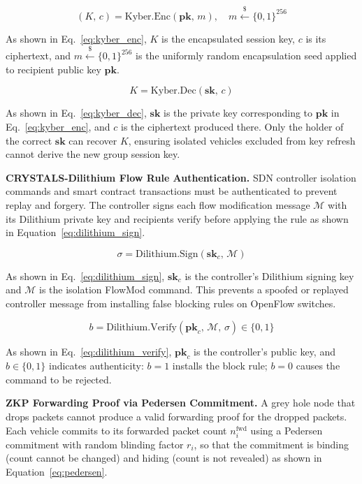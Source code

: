 \documentclass[12pt, a4paper]{report}
\begin{document}
\begin{equation}
\label{eq:kyber_enc}
(K,\, c) = \mathrm{Kyber.Enc}(\mathbf{pk},\, m),
\quad m \xleftarrow{\$} \{0,1\}^{256}
\end{equation}

As shown in Eq.~\eqref{eq:kyber_enc}, $K$ is the encapsulated session 
key, $c$ is its ciphertext, and $m \xleftarrow{\$} \{0,1\}^{256}$ is 
the uniformly random encapsulation seed applied to recipient public key 
$\mathbf{pk}$.

\begin{equation}
\label{eq:kyber_dec}
K = \mathrm{Kyber.Dec}(\mathbf{sk},\, c)
\end{equation}

As shown in Eq.~\eqref{eq:kyber_dec}, $\mathbf{sk}$ is the private key 
corresponding to $\mathbf{pk}$ in Eq.~\eqref{eq:kyber_enc}, and $c$ is 
the ciphertext produced there. Only the holder of the correct 
$\mathbf{sk}$ can recover $K$, ensuring isolated vehicles excluded from 
key refresh cannot derive the new group session key.

\textbf{CRYSTALS-Dilithium Flow Rule Authentication.}
SDN controller isolation commands and smart contract transactions must be
authenticated to prevent replay and forgery. The controller signs each
flow modification message $\mathcal{M}$ with its Dilithium private key
and recipients verify before applying the rule as shown in Equation~\eqref{eq:dilithium_sign}.

\begin{equation}
\label{eq:dilithium_sign}
\sigma = \mathrm{Dilithium.Sign}(\mathbf{sk}_c,\, \mathcal{M})
\end{equation}

As shown in Eq.~\eqref{eq:dilithium_sign}, $\mathbf{sk}_c$ is the 
controller's Dilithium signing key and $\mathcal{M}$ is the isolation 
FlowMod command. This prevents a spoofed or replayed controller message 
from installing false blocking rules on OpenFlow switches.

\begin{equation}
\label{eq:dilithium_verify}
b = \mathrm{Dilithium.Verify}(\mathbf{pk}_c,\, \mathcal{M},\, \sigma)
\in \{0,1\}
\end{equation}

As shown in Eq.~\eqref{eq:dilithium_verify}, $\mathbf{pk}_c$ is the 
controller's public key, and $b \in \{0,1\}$ indicates authenticity: 
$b = 1$ installs the block rule; $b = 0$ causes the command to be 
rejected.

\textbf{ZKP Forwarding Proof via Pedersen Commitment.}
A grey hole node that drops packets cannot produce a valid forwarding proof for
the dropped packets. Each vehicle commits to its forwarded packet count
$n_i^{\text{fwd}}$ using a Pedersen commitment with random blinding factor
$r_i$, so that the commitment is binding (count cannot be changed) and
hiding (count is not revealed) as shown in Equation~\eqref{eq:pedersen}.
\end{document}
